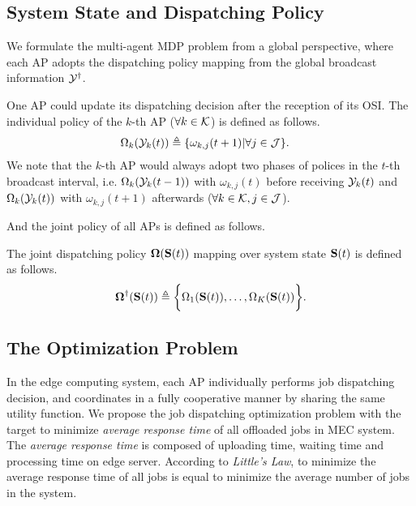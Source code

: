 \subsection{System State and Dispatching Policy}
We formulate the multi-agent MDP problem from a global perspective, where each AP adopts the dispatching policy mapping from the global broadcast information $\mathcal{Y}^{\dagger}$.
\begin{definition}
    One AP could update its dispatching decision after the reception of its OSI.
    The individual policy of the $k$-th AP ($\forall k \in\mathcal{K}$) is defined as follows.
    \begin{align}
        &\Omega_{k}(\mathcal{Y}_{k}(t)) \triangleq \{\omega_{k,j}(t+1)|\forall j\in\mathcal{J}\}.
        \label{def_action}
    \end{align}
    We note that the $k$-th AP would always adopt two phases of polices in the $t$-th broadcast interval, i.e. $\Omega_{k}(\mathcal{Y}_{k}(t-1))$ with $\omega_{k,j}(t)$ before receiving $\mathcal{Y}_{k}(t)$ and $\Omega_{k}(\mathcal{Y}_{k}(t))$ with $\omega_{k,j}(t+1)$ afterwards ($\forall k\in\mathcal{K}, j\in\mathcal{J}$).
\end{definition}

And the joint policy of all APs is defined as follows.
\begin{definition}
    The joint dispatching policy $\boldsymbol{\Omega}(\mathbf{S}(t))$ mapping over system state $\mathbf{S}(t)$ is defined as follows.
    \begin{align}
        \boldsymbol{\Omega}^{\dagger}(\mathbf{S}(t)) \triangleq \bigg\{
            \Omega_{1}(\mathbf{S}(t)), \dots, \Omega_{K}(\mathbf{S}(t))
        \bigg\}.
    \end{align}
\end{definition}

\subsection{The Optimization Problem}
In the edge computing system, each AP individually performs job dispatching decision, and coordinates in a fully cooperative manner by sharing the same utility function.
We propose the job dispatching optimization problem with the target to minimize \emph{average response time} of all offloaded jobs in MEC system.
The \emph{average response time} is composed of uploading time, waiting time and processing time on edge server.
According to \emph{Little's Law}, to minimize the average response time of all jobs is equal to minimize the average number of jobs in the system.

